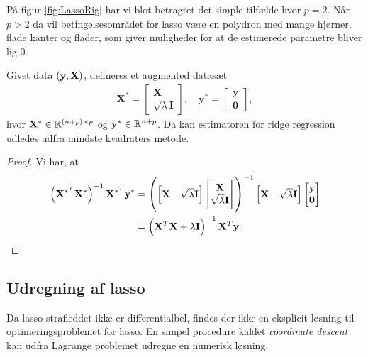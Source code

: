 På figur \ref{fig:LassoRig} har vi blot betragtet det simple tilfælde hvor $p=2$. 
Når \(p>2\) da vil betingelsesområdet for lasso være en polydron med mange hjørner, flade kanter og flader, som giver muligheder for at de estimerede parametre bliver lig 0.
%
\begin{lem}
Givet data \(\del{\y, \X}\), defineres et augmented datasæt
\begin{align*}
\mathbf{X}^* = \begin{bmatrix}
\mathbf{X} \\ \sqrt{\lambda} \mathbf{I}
\end{bmatrix}, \quad 
\mathbf{y}^* = \begin{bmatrix}
\mathbf{y} \\ \mathbf{0}
\end{bmatrix},
\end{align*}
hvor \(\X^* \in \mathbb{R}^{\del{n+p} \times p}\) og \(\mathbf{y}^* \in \mathbb{R}^{n+p}\). Da kan estimatoren for ridge regression udledes udfra mindste kvadraters metode.
\end{lem}
%
\begin{proof}
Vi har, at
\begin{align*}
\del{\X^{*^T} \X^*}^{-1} \X^{*^T} \y^* &= \left( \begin{bmatrix}
\mathbf{X} & \sqrt{\lambda} \mathbf{I}
\end{bmatrix}
\begin{bmatrix}
\mathbf{X} \\ \sqrt{\lambda} \mathbf{I}
\end{bmatrix} \right)^{-1}
\begin{bmatrix}
\mathbf{X} & \sqrt{\lambda} \mathbf{I}
\end{bmatrix}
\begin{bmatrix}
\mathbf{y} \\ \mathbf{0}
\end{bmatrix} \\
&= \left( \mathbf{X}^T \mathbf{X} + \lambda \mathbf{I} \right)^{-1} \mathbf{X}^T \mathbf{y}.
\end{align*}
\end{proof}

\subsection{Udregning af lasso} \label{subsec:udregning_lasso}
Da lasso strafleddet ikke er differentialbel, findes der ikke en eksplicit løsning til optimeringsproblemet for lasso.
En simpel procedure kaldet \textit{coordinate descent} kan udfra Lagrange problemet udregne en numerisk løsning. 

